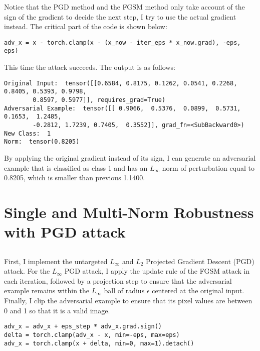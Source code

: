\documentclass[10pt]{article}
\begin{document}
Notice that the PGD method and the FGSM method only take account of the sign of the gradient to decide the next step, I try to use the actual gradient instead. The critical part of the code is shown below:

\begin{Verbatim}[frame=single]
adv_x = x - torch.clamp(x - (x_now - iter_eps * x_now.grad), -eps, eps)
\end{Verbatim}

This time the attack succeeds. The output is as follows:

\begin{Verbatim}[frame=single]
Original Input:  tensor([[0.6584, 0.8175, 0.1262, 0.0541, 0.2268, 0.8405, 0.5393, 0.9798, 
        0.8597, 0.5977]], requires_grad=True)
Adversarial Example:  tensor([[ 0.9066,  0.5376,  0.0899,  0.5731,  0.1653,  1.2485, 
        -0.2812, 1.7239, 0.7405,  0.3552]], grad_fn=<SubBackward0>)
New Class:  1
Norm:  tensor(0.8205)
\end{Verbatim}

By applying the original gradient instead of its sign, I can generate an adversarial example that is classified as class 1 and has an $L_\infty$ norm of perturbation equal to 0.8205, which is smaller than previous 1.1400.

\newpage
\section{Single and Multi-Norm Robustness with PGD attack}

\subsection{}

First, I implement the untargeted $L_\infty$ and $L_2$ Projected Gradient Descent (PGD) attack. For the $L_\infty$ PGD attack, I apply the update rule of the FGSM attack in each iteration, followed by a projection step to ensure that the adversarial example remains within the $L_\infty$ ball of radius $\epsilon$ centered at the original input. Finally, I clip the adversarial example to ensure that its pixel values are between 0 and 1 so that it is a valid image. 

\begin{Verbatim}[frame=single]
adv_x = adv_x + eps_step * adv_x.grad.sign()
delta = torch.clamp(adv_x - x, min=-eps, max=eps)
adv_x = torch.clamp(x + delta, min=0, max=1).detach()  
\end{Verbatim}
\end{document}
